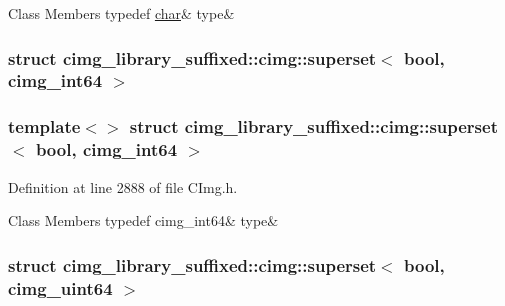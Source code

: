 \begin{DoxyFields}{Class Members}
\mbox{\label{namespacecimg__library__suffixed_1_1cimg_acdae5243dfde2cfcae0537d0cea059cd}} 
typedef \hyperlink{classchar}{char}&
type&
\\
\hline

\end{DoxyFields}
\label{structcimg__library__suffixed_1_1cimg_1_1superset_3_01bool_00_01cimg__int64_01_4}
\subsubsection{struct cimg\+\_\+library\+\_\+suffixed\+:\+:cimg\+:\+:superset$<$ bool, cimg\+\_\+int64 $>$}
\subsubsection*{template$<$$>$\newline
struct cimg\+\_\+library\+\_\+suffixed\+::cimg\+::superset$<$ bool, cimg\+\_\+int64 $>$}



Definition at line 2888 of file C\+Img.\+h.

\begin{DoxyFields}{Class Members}
\mbox{\label{namespacecimg__library__suffixed_1_1cimg_a7cc8f0581ae2fd8d5fb4f9d1fa91dbe1}} 
typedef cimg\_int64&
type&
\\
\hline

\end{DoxyFields}
\label{structcimg__library__suffixed_1_1cimg_1_1superset_3_01bool_00_01cimg__uint64_01_4}
\subsubsection{struct cimg\+\_\+library\+\_\+suffixed\+:\+:cimg\+:\+:superset$<$ bool, cimg\+\_\+uint64 $>$}
